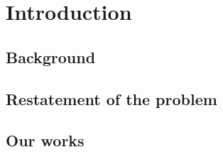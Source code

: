 \section{Introduction}
\subsection{Background}
\subsection{Restatement of the problem}
\subsection{Our works}